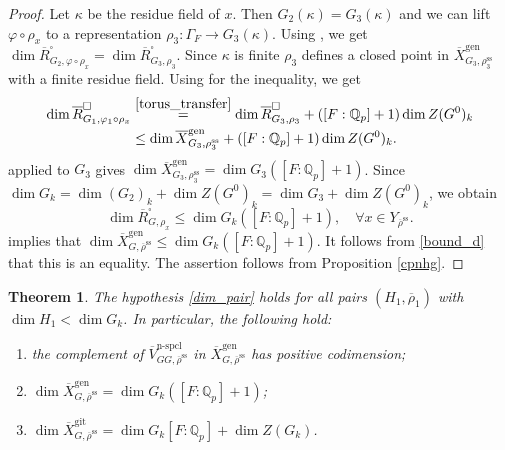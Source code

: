 \documentclass{amsart}
\newtheorem{thm}[prop]{Theorem}
\theoremstyle{definition}
\theoremstyle{remark}
\newcommand{\Qp}{\mathbb {Q}_p}
\newcommand{\Vbar}{\overline{{V}}}
\newcommand{\rhobar}{\overline{\rho}}
\newcommand{\gen}{\mathrm{gen}}
\newcommand{\gps}{\mathrm{git}}
\newcommand{\Xbar}{\overline{X}}
\DeclareMathOperator{\nspcl}{n-spcl}
\newcommand{\rhobarss}{\rhobar^{\mathrm{ss}}}
\newcommand{\Rbar}{\overline{R}}
\begin{document}
\begin{proof}
Let $\kappa$ be the residue field of $x$. Then  $G_2(\kappa) = G_3(\kappa)$ and  we can lift $\varphi \circ \rho_x$ to a representation $\rho_3 : \Gamma_F \to G_3(\kappa)$.
    Using , we get $\dim \Rbar^{\square}_{G_2, \varphi \circ \rho_x} = \dim \Rbar^{\square}_{G_3, \rho_3}$. Since $\kappa$ is finite $\rho_3$ defines a closed point in $\Xbar^{\gen}_{G_3, \rho_3^{\mathrm{ss}}}$ with a finite residue field. 
  Using  for the inequality, we get
  \begin{equation}\label{transfer}
  \begin{split}
\dim \Rbar^{\square}_{G_1, \varphi_1 \circ \rho_x} &\overset{\eqref{torus_transfer}}{=} \dim \Rbar^{\square}_{G_3, \rho_3} + ([F:\Qp]+1) \dim Z(G^0)_k \\
        &\leq \dim \Xbar^{\gen}_{G_3, \rho_3^{\mathrm{ss}}} + ([F:\Qp]+1) \dim Z(G^0)_k.
        \end{split}
\end{equation}
 applied to  $G_3$ gives 
        $\dim \Xbar^{\gen}_{G_3, \rho_3^{\mathrm{ss}}} = \dim G_3 ([F:\Qp] +1)$. Since 
        $\dim G_k = \dim (G_2)_k + \dim Z(G^0)_k = \dim G_3 + \dim Z(G^0)_k$, we obtain 
        \begin{equation}
          \dim \Rbar^{\square}_{G, \rho_x}\le \dim G_k ([F:\Qp]+1), \quad \forall x\in Y_{\rhobarss}.
          \end{equation}
        implies that $\dim \Xbar^{\gen}_{G, \rhobarss} \le \dim G_k ([F:\Qp]+1)$. It follows 
from \eqref{bound_d} that this is an equality. The assertion follows from Proposition \ref{cpnhg}.
\end{proof}


\begin{thm}\label{thm_bound_space} 
The hypothesis \eqref{dim_pair} holds for all pairs 
$(H_1, \rhobar_1)$ with $\dim H_1< \dim G_k$. In particular, the following hold:
\begin{enumerate}
\item the complement of $\Vbar^{\nspcl}_{GG, \rhobarss}$  in $\Xbar^{\gen}_{G, \rhobarss}$ 
 has positive codimension;
\item $\dim \Xbar^{\gen}_{G, \rhobarss}= \dim G_k ([F:\Qp] +1)$;
\item $\dim \Xbar^{\gps}_{G, \rhobarss}= \dim G_k [F:\Qp] + \dim Z(G_k)$.
\end{enumerate} 
\end{thm}
\end{document}
